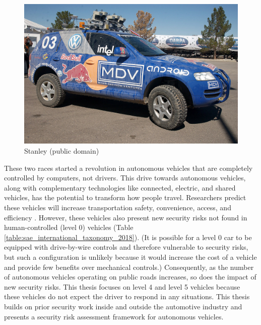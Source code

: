 \documentclass{article}
\begin{document}
\begin{figure}[h] \centering
    \includegraphics[width=\textwidth]{images/DSC_5090.jpg}
    \caption{Stanley (public domain)}
    \label{figure:stanley}
\end{figure}

These two races started a revolution in autonomous vehicles that are completely controlled by computers, not drivers. This drive towards autonomous vehicles, along with complementary technologies like connected, electric, and shared vehicles, has the potential to transform how people travel. Researchers predict these vehicles will increase transportation safety, convenience, access, and efficiency \citep{littman_autonomous_2018, kockelman_implications_2016}. However, these vehicles also present new security risks not found in human-controlled (level 0) vehicles (Table \ref{table:sae_international_taxonomy_2018}). (It is possible for a level 0 car to be equipped with drive-by-wire controls and therefore vulnerable to security risks, but such a configuration is unlikely because it would increase the cost of a vehicle and provide few benefits over mechanical controls.) Consequently, as the number of autonomous vehicles operating on public roads increases, so does the impact of new security risks. This thesis focuses on level 4 and level 5 vehicles because these vehicles do not  expect the driver to respond in any situations. This thesis builds on prior security work inside and outside the automotive industry and presents a security risk assessment framework for autonomous vehicles.
\end{document}
